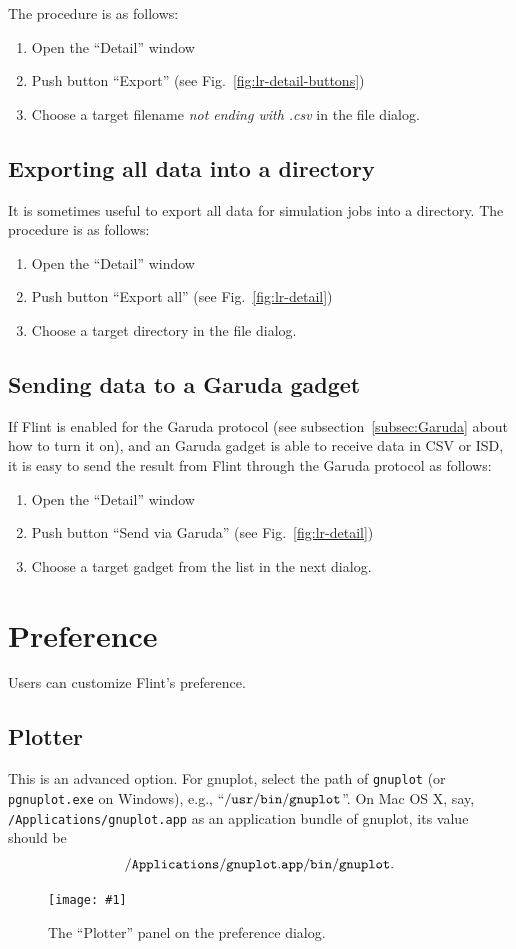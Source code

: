 \documentclass[a4paper,10pt]{report}
\newcommand\FigureOfImage[2]{\begin{figure}[h]
  \centering
  \texttt{[image: \#1]}
  \caption{#2}\label{fig:#1}
\end{figure}}
\begin{document}
The procedure is as follows:
\begin{enumerate}
\item Open the ``Detail'' window
\item Push button ``Export'' (see Fig.~\ref{fig:lr-detail-buttons})
\item Choose a target filename \emph{not ending with .csv} in the file dialog.
\end{enumerate}

\subsection{Exporting all data into a directory}
It is sometimes useful to export all data for simulation jobs into a directory.
The procedure is as follows:
\begin{enumerate}
\item Open the ``Detail'' window
\item Push button ``Export all'' (see Fig.~\ref{fig:lr-detail})
\item Choose a target directory in the file dialog.
\end{enumerate}

\subsection{Sending data to a Garuda gadget}
If Flint is enabled for the Garuda protocol (see subsection~\ref{subsec:Garuda}
about how to turn it on), and an Garuda gadget is able to receive data in CSV or
ISD, it is easy to send the result from Flint through the Garuda protocol as
follows:
\begin{enumerate}
\item Open the ``Detail'' window
\item Push button ``Send via Garuda'' (see Fig.~\ref{fig:lr-detail})
\item Choose a target gadget from the list in the next dialog.
\end{enumerate}

\section{Preference}
\label{sec:preference}
Users can customize Flint's preference.

\subsection{Plotter}
This is an advanced option.
For gnuplot, select the path of {\tt gnuplot} (or {\tt pgnuplot.exe} on Windows),
e.g., ``$\tt{/usr/bin/gnuplot}$''. On Mac OS X, say,
{\tt /Applications/gnuplot.app} as an application bundle of gnuplot, its value
should be \[{\tt /Applications/gnuplot.app/bin/gnuplot}.\]
\FigureOfImage{preference-plotter}{The ``Plotter'' panel on the preference dialog.}
\end{document}
